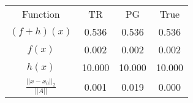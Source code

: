 \begin{tabular}{| c |c |c |c |}
    \hline
    \rowcolor[gray]{0.9}
\multicolumn{4}{|c|}{Minima} \\ \hline Function & TR & PG & True \\
    \hline
  \rowcolor[gray]{0.7}
    $ (f + h)(x) $ & 0.536 & 0.536 & 0.536 \\
  \hline
  \rowcolor[gray]{0.8}
    $ f(x) $ & 0.002 & 0.002 & 0.002 \\
  \hline
  \rowcolor[gray]{0.7}
    $ h(x) $ & 10.000 & 10.000 & 10.000 \\
  \hline
  \rowcolor[gray]{0.8}
    $ \frac{||x - x_0||_2}{||A||} $ & 0.001 & 0.019 & 0.000 \\
  \hline
\end{tabular}
